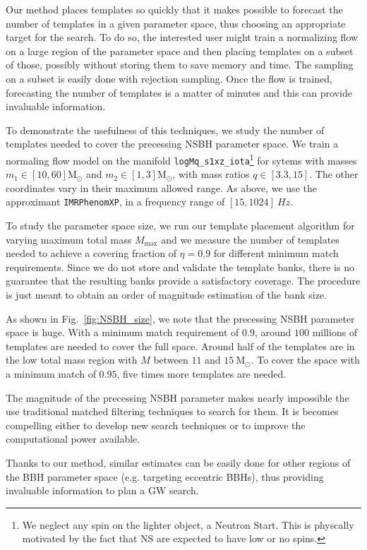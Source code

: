 \documentclass[twocolumn,showpacs,preprintnumbers,nofootinbib,prd,
superscriptaddress,10pt]{revtex4-2}
\begin{document}
Our method places templates so quickly that it makes possible to forecast the number of templates in a given parameter space, thus choosing an appropriate target for the search.
To do so, the interested user might train a normalizing flow on a large region of the parameter space and then placing templates on a subset of those, possibly without storing them to save memory and time. The sampling on a subset is easily done with rejection sampling.
Once the flow is trained, forecasting the number of templates is a matter of minutes and this can provide invaluable information.

To demonstrate the usefulness of this techniques, we study the number of templates needed to cover the precessing NSBH parameter space.
We train a normaling flow model on the manifold \texttt{logMq\_s1xz\_iota}\footnote{We neglect any spin on the lighter object, a Neutron Start. This is physcally motivated by the fact that NS are expected to have low or no spins.} for sytems with masses $m_1 \in [10, 60] \mathrm{M_\odot}$ and  $m_2 \in [1, 3] \mathrm{M_\odot}$, with mass ratios $q \in [3.3, 15]$. The other coordinates vary in their maximum allowed range. As above, we use the approximant \texttt{IMRPhenomXP}, in a frequency range of $[15, 1024] \SI{}{Hz}$.

To study the parameter space size, we run our template placement algorithm for varying maximum total mass $M_\text{max}$ and we measure the number of templates needed to achieve a covering fraction of $\eta = 0.9$ for different minimum match requirements.
Since we do not store and validate the template banks, there is no guarantee that the resulting banks provide a satisfactory coverage. The procedure is just meant to obtain an order of magnitude estimation of the bank size.

As shown in Fig.~\ref{fig:NSBH_size}, we note that the precessing NSBH parameter space is huge. With a minimum match requirement of $0.9$, around $100$ millions of templates are needed to cover the full space. Around half of the templates are in the low total mass region with $M$ between $11$ and $\SI{15}{ \mathrm{M_\odot}}$.
To cover the space with a minimum match of $0.95$, five times more templates are needed.

The magnitude of the precessing NSBH parameter makes nearly impossible the use traditional matched filtering techniques to search for them. It is becomes compelling either to develop new search techniques or to improve the computational power available.

Thanks to our method, similar estimates can be easily done for other regions of the BBH parameter space (e.g. targeting eccentric BBHs), thus providing invaluable information to plan a GW search.
\end{document}
